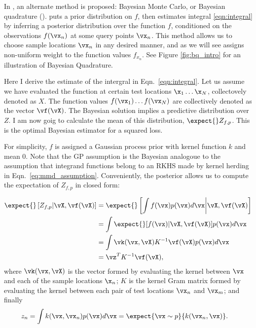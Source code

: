In \citep{BZMonteCarlo}, an alternate method is proposed: Bayesian Monte Carlo, or Bayesian quadrature (\bq). \bq{} puts a prior distribution on $f$, then estimates integral \eqref{eqn:integral} by inferring a posterior distribution over the function $f$, conditioned on the observations $f(\vx_n)$ at some query points $\vx_n$. This method allows us to choose sample locations $\vx_n$ in any desired manner, and as we will see assigns non-uniform weight to the function values $f_{x_n}$. See Figure \ref{fig:bq_intro} for an illustration of Bayesian Quadrature.

Here I derive the \bq{} estimate of the intergral in Eqn.\ \eqref{eqn:integral}. Let us assume we have evaluated the function at certain test locations $\x_1 \ldots \x_N$, collectovely denoted as $X$. The function values $f(\vx_1) \ldots f(\vx_N)$ are collectively denoted as the vector $\vf(\vX)$. The Bayesian solution implies a predictive distribution over $Z$. I am now goig to calculate the mean of this distribution, $\expect{}Z_{f,p}$. This is the optimal Bayesian estimator for a squared loss.

For simplicity, $f$ is assigned a Gaussian process prior with kernel function $k$ and mean $0$.  Note that the GP assumption is the Bayesian analogoue to the assumption that integrand functions belong to an RKHS made by kernel herding in Eqn.\ \eqref{eq:mmd_assumption}. Conveniently, the \gp{} posterior allows us to compute the expectation of $Z_{f,p}$ in closed form: 

\begin{align}
	\expect{} \left[Z_{f,p} \vert \vX, \vf(\vX) \right] &= \expect{} \left[ {\int f(\vx)p(\vx)d\vx} \middle\vert \vX, \vf(\vX) \right]\\
	 & = \int \expect{} [f(\vx) \vert \vX, \vf(\vX) ] p(\vx) d\vx\\
	 & = \int \vk(\vx, \vX) K^{-1} \vf(\vX) p(\vx) d\vx \\
	 & = \vz^T K^{-1} \vf(\vX),
	\label{eq:marg_mean_symbolic}
\end{align} 
where $\vk(\vx, \vX)$ is the vector formed by evaluating the kernel between $\vx$ and each of the sample locations $\x_n$; $K$ is the kernel Gram matrix formed by evaluating the kernel between each pair of test locations $\vx_n$ and $\vx_m$; and finally
\begin{align}
z_n & = \int k(\vx, \vx_n) p(\vx) d\vx = \expect{\vx \sim p}{k(\vx_n, \vx)}.
\end{align}

